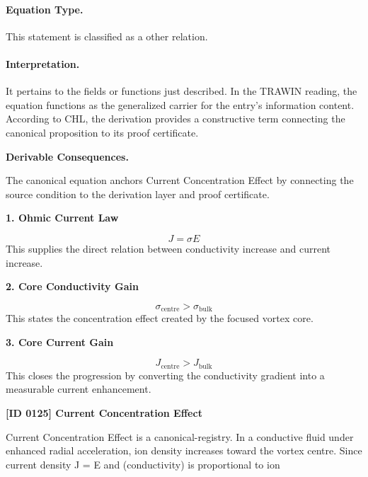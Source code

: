 \paragraph{Equation Type.}
This statement is classified as a other relation.

\paragraph{Interpretation.}
It pertains to the fields or functions just described. In the TRAWIN reading, the equation functions as the generalized carrier for the entry’s information content. According to CHL, the derivation provides a constructive term connecting the canonical proposition to its proof certificate.

\par\vspace{0.35em}
\noindent\textbf{Derivable Consequences.}\quad
\begingroup
\footnotesize
\raggedright
The canonical equation anchors Current Concentration Effect by connecting the source condition to the derivation layer and proof certificate.
\par\endgroup

\noindent\textbf{1. Ohmic Current Law}\par
\[
J = \sigma E
\]
\noindent This supplies the direct relation between conductivity increase and current increase.\par
\noindent\textbf{2. Core Conductivity Gain}\par
\[
\sigma_{\mathrm{centre}} > \sigma_{\mathrm{bulk}}
\]
\noindent This states the concentration effect created by the focused vortex core.\par
\noindent\textbf{3. Core Current Gain}\par
\[
J_{\mathrm{centre}} > J_{\mathrm{bulk}}
\]
\noindent This closes the progression by converting the conductivity gradient into a measurable current enhancement.\par

\clearpage
\noindent\textbf{[ID 0125] Current Concentration Effect}\par
\vspace{0.35em}
\begingroup\small
{}
Current Concentration Effect is a canonical-registry. In a conductive fluid under enhanced radial acceleration, ion density increases toward the vortex centre. Since current density J =   E and   (conductivity) is proportional to ion

